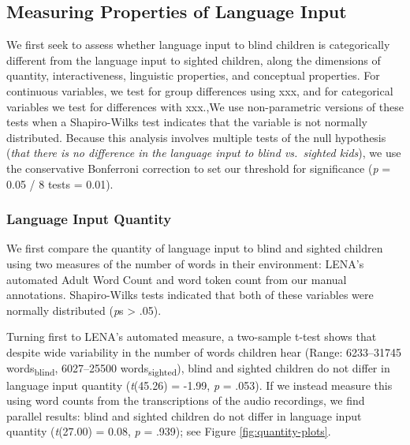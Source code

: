\documentclass[
  man,floatsintext]{apa6}
\begin{document}
\hypertarget{measuring-properties-of-language-input}{%
\subsection{Measuring Properties of Language Input}\label{measuring-properties-of-language-input}}

We first seek to assess whether language input to blind children is categorically different from the language input to sighted children, along the dimensions of quantity, interactiveness, linguistic properties, and conceptual properties. For continuous variables, we test for group differences using xxx, and for categorical variables we test for differences with xxx.,We use non-parametric versions of these tests when a Shapiro-Wilks test indicates that the variable is not normally distributed. Because this analysis involves multiple tests of the null hypothesis (\emph{that there is no difference in the language input to blind vs.~sighted kids}), we use the conservative Bonferroni correction to set our threshold for significance (\emph{p} = 0.05 / 8 tests = 0.01).

\hypertarget{language-input-quantity}{%
\subsubsection{Language Input Quantity}\label{language-input-quantity}}

We first compare the quantity of language input to blind and sighted children using two measures of the number of words in their environment: LENA's automated Adult Word Count and word token count from our manual annotations. Shapiro-Wilks tests indicated that both of these variables were normally distributed (\emph{p}s \textgreater{} .05).

Turning first to LENA's automated measure, a two-sample t-test shows that despite wide variability in the number of words children hear (Range: 6233--31745 words\textsubscript{blind}, 6027--25500 words\textsubscript{sighted}), blind and sighted children do not differ in language input quantity (\emph{t}(45.26) = -1.99, \emph{p} = .053). If we instead measure this using word counts from the transcriptions of the audio recordings, we find parallel results: blind and sighted children do not differ in language input quantity (\emph{t}(27.00) = 0.08, \emph{p} = .939); see Figure \ref{fig:quantity-plots}.
\end{document}
